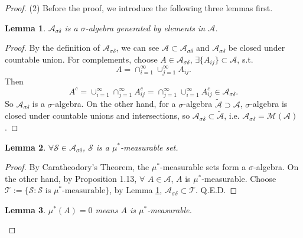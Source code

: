 \documentclass{article}
\newtheorem{lemma}{Lemma}
\begin{document}
\begin{proof}
    (2) Before the proof, we introduce 
    the following three lemmas first. 
    \begin{lemma}
        \label{lem:AsigmadeltaFormSA}
        $\mathcal{A}_{\sigma\delta}$ is a $\sigma$-algebra 
        generated by elements in $\mathcal{A}$.
    \end{lemma}
    \begin{proof}
        By the definition of $\mathcal{A}_{\sigma\delta}$, we can see $\mathcal{A}\subset\mathcal{A}_{\sigma\delta}$ 
        and $\mathcal{A}_{\sigma\delta}$ 
        be closed under countable union. 
        For complements, choose $A\in\mathcal{A}_{\sigma\delta}$, 
        $\exists\{A_{ij}\}\subset\mathcal{A}$, s.t. 
        \begin{displaymath}
            A=\cap_{i=1}^{\infty}\cup_{j=1}^{\infty}A_{ij}.
        \end{displaymath}
        Then 
        \begin{displaymath}
            A^{c}=\cup_{i=1}^{\infty}\cap_{j=1}^{\infty}A_{ij}^{c}
            =\cap_{j=1}^{\infty}\cup_{i=1}^{\infty}A_{ij}^{c}
            \in \mathcal{A}_{\sigma\delta}.
        \end{displaymath}
        So $\mathcal{A}_{\sigma\delta}$ is a $\sigma$-algebra.
        On the other hand, for a $\sigma$-algebra 
        $\tilde{\mathcal{A}}\supset\mathcal{A}$,
        $\sigma$-algebra is closed 
        under countable unions and intersections, 
        so $\mathcal{A}_{\sigma\delta}\subset\tilde{\mathcal{A}}$, 
        i.e. $\mathcal{A}_{\sigma\delta}=\mathcal{M}(\mathcal{A})$.
    \end{proof}
    \begin{lemma}
        \label{lem:AsdMS}
        $\forall\mathcal{S}\in\mathcal{A}_{\sigma\delta}$, 
        $\mathcal{S}$ is a $\mu^*$-measurable set.
    \end{lemma}
    \begin{proof}
        By Caratheodory's Theorem, the $\mu^*$-measurable sets 
        form a $\sigma$-algebra. 
        On the other hand, by Proposition 1.13, 
        $\forall$ $A\in\mathcal{A}$, $A$ is $\mu^*$-measurable.
        Choose $\mathcal{T}:=\{\mathcal{S}:\mathcal{S}\text{ is }
        \mu^*\text{-measurable}\}$, 
        by Lemma \ref{lem:AsigmadeltaFormSA}, 
        $\mathcal{A}_{\sigma\delta}\subset\mathcal{T}$. Q.E.D.
    \end{proof}
    \begin{lemma}
        \label{lem:ZeroMeasurable}
        $\mu^{*}(A)=0$ means $A$ is $\mu^{*}$-measurable.

\end{lemma}
\end{proof}
\end{document}
